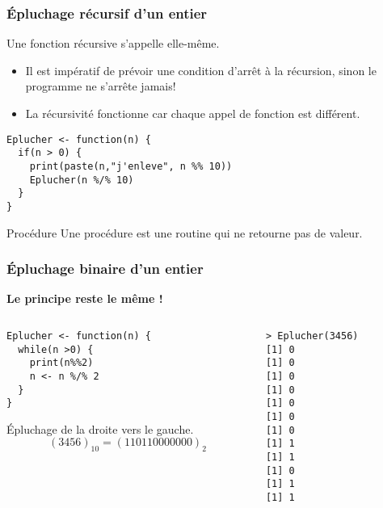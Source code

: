 \documentclass[10pt]{beamer}
\begin{document}
\begin{frame}[fragile]
  \frametitle{Épluchage récursif d'un entier}
  \begin{block}{Une fonction récursive s'appelle elle-même.}
    \begin{itemize}
    \item Il est impératif de prévoir une condition d'arrêt à la récursion, sinon le programme ne s'arrête jamais!
    \item La récursivité fonctionne car chaque appel de fonction est différent.
    \end{itemize}

  \end{block}

  \begin{lstlisting}[style=editor]
Eplucher <- function(n) {
  if(n > 0) {
    print(paste(n,"j'enleve", n %% 10))
    Eplucher(n %/% 10)
  }
}    
  \end{lstlisting}

  \begin{block}{Procédure}
    Une procédure est une routine qui ne retourne pas de valeur.
  \end{block}

\end{frame}



\begin{frame}[fragile]
  \frametitle{Épluchage  binaire d'un entier}
  \begin{center}
    \alert{\textbf{Le principe reste le même !}}
  \end{center}
 

\begin{columns}[t]
\begin{column}{0.62\textwidth}
\begin{lstlisting}[style=editor]
Eplucher <- function(n) {
  while(n >0) {
    print(n%%2)
    n <- n %/% 2
  }
}  
\end{lstlisting}
Épluchage de la droite vers le gauche.
$$
(3456)_{10} = (110110000000)_2
$$

\end{column}
\begin{column}{0.38\textwidth}
  \begin{lstlisting}
> Eplucher(3456)
[1] 0
[1] 0
[1] 0
[1] 0
[1] 0
[1] 0
[1] 0
[1] 1
[1] 1
[1] 0
[1] 1
[1] 1    
\end{lstlisting}
\end{column}
\end{columns}
\end{frame}
\end{document}
